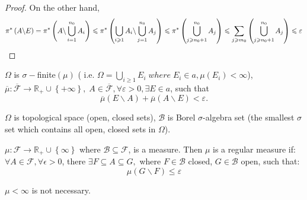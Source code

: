 \begin{proof}
	On the other hand,
	\begin{equation}
	\small 
	{\pi ^*}\left( {A\backslash E} \right) = {\pi ^*}\left( {A\backslash \bigcup\limits_{i = 1}^{{n_0}} {{A_i}} } \right)\leqslant {\pi ^*}\left( {\bigcup\limits_{i \geqslant 1} {{A_i}} \backslash \bigcup\limits_{j = 1}^{{n_0}} {{A_j}} } \right)\leqslant {\pi ^*}\left( {\bigcup\limits_{j \geqslant {n_0} + 1}^{{n_0}} {{A_j}} } \right)  \leqslant \sum\limits_{j \geqslant {m_0}} {\left( {\bigcup\limits_{j \geqslant {n_0} + 1}^{{n_0}} {{A_j}} } \right)} \leqslant \varepsilon 								
	\label{eq9.7}
	\end{equation}
	
\end{proof}

\begin{remark}
	$ \Omega $ is $ \sigma-$finite$ (\mu) $ ( i.e. $\Omega  = \bigcup\limits_{i \geqslant 1} {{E_i}} \;where\;{E_i} \in a,\mu \left( {{E_i}} \right) < \infty $), $\overline \mu  :\overline {\mathcal{F}}  \to {{\mathbb{R}}_ + } \cup \left\{ { + \infty } \right\},\;A \in \overline {\mathcal{F}} ,\forall \varepsilon  > 0,\exists E \in a$, such that
	\begin{equation}
	\overline \mu  \left( {E\backslash A} \right) + \overline \mu  \left( {A\backslash E} \right) < \varepsilon .
	\label{eq9.8}
	\end{equation}
	\label{rmk9.1}
\end{remark}


$\Omega$ is topological space (open, closed sets), $\mathcal{B}$ is Borel $\sigma$-algebra set (the smallest $\sigma$ set which contains all open, closed sets in $\Omega$).

\begin{definition}
	$ \mu: \mathcal{F} \to  {\mathbb{R}_ + } \cup \left\{ \infty  \right\} $ where $\mathcal{B} \subseteq \mathcal{F}$, is a measure. Then $ \mu $ is a regular measure if: $ \forall A \in \mathcal{F}, \forall \epsilon >0 $, there $\exists F \subseteq A \subseteq G,$ where $ F \in \mathcal{B}$ closed, $ G \in \mathcal{B}$ open, such that:
	\begin{equation}
	\mu \left( {G\backslash F} \right) \leqslant \varepsilon 
	\label{eq9.9}
	\end{equation}
	\label{def9.1}
\end{definition}

\begin{remark}
	$ \mu < \infty$ is not necessary.
	\label{rmk9.2}
\end{remark}

